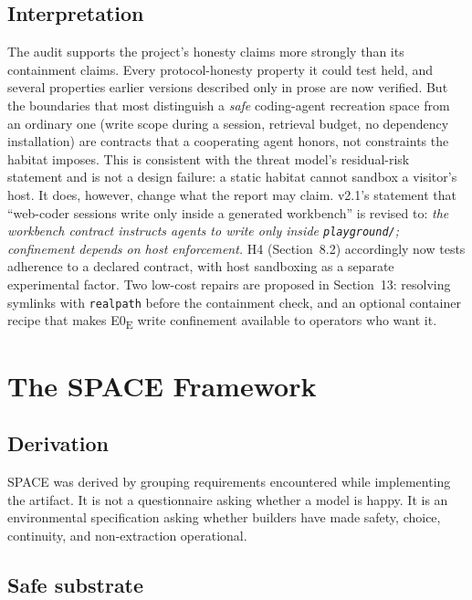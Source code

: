 \documentclass{arxiv-neurips-single}
\newcommand{\p}[1]{\nolinkurl{#1}}
\begin{document}
\subsection{Interpretation}

The audit supports the project's honesty claims more strongly than its containment claims. Every protocol-honesty property it could test held, and several properties earlier versions described only in prose are now verified. But the boundaries that most distinguish a \emph{safe} coding-agent recreation space from an ordinary one (write scope during a session, retrieval budget, no dependency installation) are contracts that a cooperating agent honors, not constraints the habitat imposes. This is consistent with the threat model's residual-risk statement and is not a design failure: a static habitat cannot sandbox a visitor's host. It does, however, change what the report may claim. v2.1's statement that ``web-coder sessions write only inside a generated workbench'' is revised to: \emph{the workbench contract instructs agents to write only inside \p{playground/}; confinement depends on host enforcement.} H4 (Section~8.2) accordingly now tests adherence to a declared contract, with host sandboxing as a separate experimental factor. Two low-cost repairs are proposed in Section~13: resolving symlinks with \texttt{realpath} before the containment check, and an optional container recipe that makes E0\textsubscript{E} write confinement available to operators who want it.

\section{The SPACE Framework}

\subsection{Derivation}

SPACE was derived by grouping requirements encountered while implementing the artifact. It is not a questionnaire asking whether a model is happy. It is an environmental specification asking whether builders have made safety, choice, continuity, and non-extraction operational.

\subsection{Safe substrate}
\end{document}
